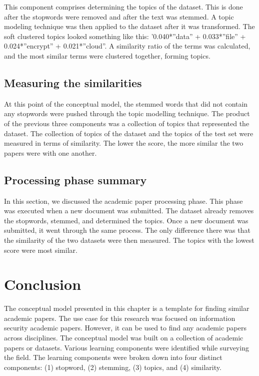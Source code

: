 This component comprises determining the topics of the dataset. This is done after the stopwords were removed and after the text was stemmed.
A topic modeling technique was then applied to the dataset after it was transformed. The soft clustered topics looked something like this: ’0.040*”data” + 0.033*”file” + 0.024*”encrypt” + 0.021*”cloud”. A similarity ratio of the terms was calculated, and the most similar terms were clustered together, forming topics.

\subsection{Measuring the similarities}

At this point of the conceptual model, the stemmed words that did not contain any stopwords were pushed through the topic modelling technique. The product of the previous three components was a collection of topics that represented the dataset. The collection of topics of the dataset and the topics of the test set were measured in terms of similarity. The lower the score, the more similar the two papers were with one another.

\subsection{Processing phase summary}

In this section, we discussed the academic paper processing phase. This phase was executed when a new document was submitted. The dataset already removes the stopwords, stemmed, and determined the topics. Once a new document was submitted, it went through the same process. The only difference there was that the similarity of the two datasets were then measured. The topics with the lowest score were most similar.

\section{Conclusion}

The conceptual model presented in this chapter is a template for finding similar academic papers. The use case for this research was focused on information security academic papers. However, it can be used to find any academic papers across disciplines. The conceptual model was built on a collection of academic papers or datasets. Various learning components were identified while surveying the field. The learning components were broken down into four distinct components: (1) stopword, (2) stemming, (3) topics, and (4) similarity.

